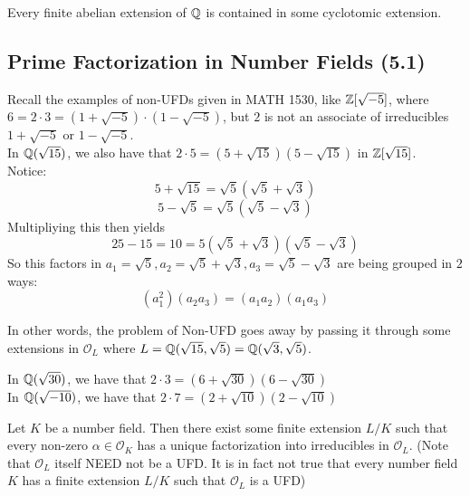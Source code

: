 \begin{theorem}
Every finite abelian extension of $\mathbb{Q}$ is contained in some cyclotomic extension.
\end{theorem}

\subsection{Prime Factorization in Number Fields (5.1)}

Recall the examples of non-UFDs given in MATH 1530, like $\mathbb{Z}[\sqrt{-5}]$, where $6 = 2 \cdot 3 = (1 + \sqrt{-5}) \cdot (1 - \sqrt{-5})$, but $2$ is not an associate of irreducibles $1 + \sqrt{-5}$ or $1 - \sqrt{-5}$.\\

In $\mathbb{Q}(\sqrt{15})$, we also have that $2 \cdot 5 = (5 + \sqrt{15})(5 - \sqrt{15})$ in $\mathbb{Z}[\sqrt{15}]$.\\

Notice:
\[5 + \sqrt{15} = \sqrt{5}(\sqrt{5} + \sqrt{3})\]
\[5 - \sqrt{5} = \sqrt{5}(\sqrt{5} - \sqrt{3})\]
Multipliying this then yields 
\[25 - 15 = 10 = 5(\sqrt{5} + \sqrt{3})(\sqrt{5} - \sqrt{3})\]
So this factors in $a_1 = \sqrt{5}, a_2 = \sqrt{5} + \sqrt{3}, a_3 = \sqrt{5} - \sqrt{3}$ are being grouped in $2$ ways:
\[(a_1^2)(a_2 a_3) = (a_1 a_2)(a_1 a_3)\]

In other words, the problem of Non-UFD goes away by passing it through some extensions in $\mathcal{O}_L$ where $L = \mathbb{Q}(\sqrt{15}, \sqrt{5}) = \mathbb{Q}(\sqrt{3}, \sqrt{5})$. 

In $\mathbb{Q}(\sqrt{30})$, we have that $2 \cdot 3 = (6 + \sqrt{30})(6 - \sqrt{30})$\\

In $\mathbb{Q}(\sqrt{-10})$, we have that $2 \cdot 7 = (2 + \sqrt{10})(2 - \sqrt{10})$\\


\begin{theorem}
Let $K$ be a number field. Then there exist some finite extension $L/K$ such that every non-zero $\alpha \in \mathcal{O}_K$ has a unique factorization into irreducibles in $\mathcal{O}_L$. (Note that $\mathcal{O}_L$ itself NEED not be a UFD. It is in fact not true that every number field $K$ has a finite extension $L/K$ such that $\mathcal{O}_L$ is a UFD)
\end{theorem}